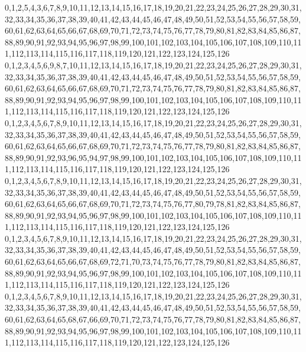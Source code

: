 \documentclass[12pt]{article}
\begin{document}
{0,1,2,5,4,3,6,7,8,9,10,11,12,13,14,15,16,17,18,19,20,21,22,23,24,25,26,27,28,29,30,31,32,33,34,35,36,37,38,39,40,41,42,43,44,45,46,47,48,49,50,51,52,53,54,55,56,57,58,59,60,61,62,63,64,65,66,67,68,69,70,71,72,73,74,75,76,77,78,79,80,81,82,83,84,85,86,87,88,89,90,91,92,93,94,95,96,97,98,99,100,101,102,103,104,105,106,107,108,109,110,111,112,113,114,115,116,117,118,119,120,121,122,123,124,125,126\\
0,1,2,3,4,5,6,9,8,7,10,11,12,13,14,15,16,17,18,19,20,21,22,23,24,25,26,27,28,29,30,31,32,33,34,35,36,37,38,39,40,41,42,43,44,45,46,47,48,49,50,51,52,53,54,55,56,57,58,59,60,61,62,63,64,65,66,67,68,69,70,71,72,73,74,75,76,77,78,79,80,81,82,83,84,85,86,87,88,89,90,91,92,93,94,95,96,97,98,99,100,101,102,103,104,105,106,107,108,109,110,111,112,113,114,115,116,117,118,119,120,121,122,123,124,125,126\\
0,1,2,3,4,5,6,7,8,9,10,11,12,13,14,15,16,17,18,19,20,21,22,23,24,25,26,27,28,29,30,31,32,33,34,35,36,37,38,39,40,41,42,43,44,45,46,47,48,49,50,51,52,53,54,55,56,57,58,59,60,61,62,63,64,65,66,67,68,69,70,71,72,73,74,75,76,77,78,79,80,81,82,83,84,85,86,87,88,89,90,91,92,93,96,95,94,97,98,99,100,101,102,103,104,105,106,107,108,109,110,111,112,113,114,115,116,117,118,119,120,121,122,123,124,125,126\\
0,1,2,3,4,5,6,7,8,9,10,11,12,13,14,15,16,17,18,19,20,21,22,23,24,25,26,27,28,29,30,31,32,33,34,35,36,37,38,39,40,41,42,43,44,45,46,47,48,49,50,51,52,53,54,55,56,57,58,59,60,61,62,63,64,65,66,67,68,69,70,71,72,73,74,75,76,77,80,79,78,81,82,83,84,85,86,87,88,89,90,91,92,93,94,95,96,97,98,99,100,101,102,103,104,105,106,107,108,109,110,111,112,113,114,115,116,117,118,119,120,121,122,123,124,125,126\\
0,1,2,3,4,5,6,7,8,9,10,11,12,13,14,15,16,17,18,19,20,21,22,23,24,25,26,27,28,29,30,31,32,33,34,35,36,37,38,39,40,41,42,43,44,45,46,47,48,49,50,51,52,53,54,55,56,57,58,59,60,61,62,63,64,65,66,67,68,69,72,71,70,73,74,75,76,77,78,79,80,81,82,83,84,85,86,87,88,89,90,91,92,93,94,95,96,97,98,99,100,101,102,103,104,105,106,107,108,109,110,111,112,113,114,115,116,117,118,119,120,121,122,123,124,125,126\\
0,1,2,3,4,5,6,7,8,9,10,11,12,13,14,15,16,17,18,19,20,21,22,23,24,25,26,27,28,29,30,31,32,33,34,35,36,37,38,39,40,41,42,43,44,45,46,47,48,49,50,51,52,53,54,55,56,57,58,59,60,61,62,63,64,65,68,67,66,69,70,71,72,73,74,75,76,77,78,79,80,81,82,83,84,85,86,87,88,89,90,91,92,93,94,95,96,97,98,99,100,101,102,103,104,105,106,107,108,109,110,111,112,113,114,115,116,117,118,119,120,121,122,123,124,125,126\\
}
\end{document}

